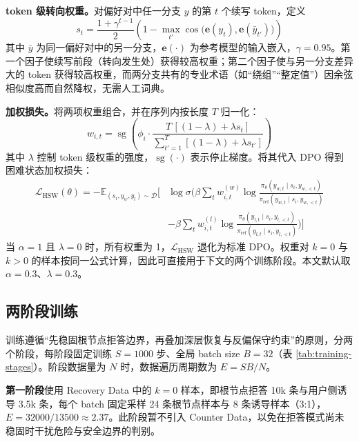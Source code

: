 \documentclass[fontset=fandol,type=master,campus=shenzhen,etitleauto=true]{hithesisbook}
\begin{document}
\textbf{token 级转向权重。}对偏好对中任一分支 $y$ 的第 $t$ 个续写 token，定义
\begin{equation}
s_t = \frac{1 + \gamma^{t-1}}{2} \left( 1 - \max_{t'} \cos\!\big(\mathbf{e}(y_t), \mathbf{e}(\bar{y}_{t'})\big) \right)
\end{equation}
其中 $\bar{y}$ 为同一偏好对中的另一分支，$\mathbf{e}(\cdot)$ 为参考模型的输入嵌入，$\gamma = 0.95$。第一个因子使续写前段（转向发生处）获得较高权重；第二个因子使与另一分支差异大的 token 获得较高权重，而两分支共有的专业术语（如“绕组”“整定值”）因余弦相似度高而自然降权，无需人工词典。

\textbf{加权损失。}将两项权重组合，并在序列内按长度 $T$ 归一化：
\begin{equation}
w_{i,t} = \operatorname{sg}\!\left( \phi_i \cdot \frac{T\,[(1 - \lambda) + \lambda s_t]}{\sum_{t'=1}^{T} [(1 - \lambda) + \lambda s_{t'}]} \right)
\end{equation}
其中 $\lambda$ 控制 token 级权重的强度，$\operatorname{sg}(\cdot)$ 表示停止梯度。将其代入 DPO 得到困难状态加权损失：
\begin{equation}
\begin{aligned}
\mathcal{L}_{\text{HSW}}(\theta) = -\mathbb{E}_{(s_i,y_w,y_l)\sim\mathcal{D}}\Bigg[
&\log\sigma\Bigg(\beta\sum_{t}w_{i,t}^{(w)}\log\frac{\pi_\theta(y_{w,t}\mid s_i,y_{w,<t})}{\pi_{\text{ref}}(y_{w,t}\mid s_i,y_{w,<t})} \\
&-\beta\sum_{t}w_{i,t}^{(l)}\log\frac{\pi_\theta(y_{l,t}\mid s_i,y_{l,<t})}{\pi_{\text{ref}}(y_{l,t}\mid s_i,y_{l,<t})}\Bigg)\Bigg]
\end{aligned}
\end{equation}
当 $\alpha = 1$ 且 $\lambda = 0$ 时，所有权重为 1，$\mathcal{L}_{\text{HSW}}$ 退化为标准 DPO。权重对 $k = 0$ 与 $k > 0$ 的样本按同一公式计算，因此可直接用于下文的两个训练阶段。本文默认取 $\alpha = 0.3$、$\lambda = 0.3$。

\subsection{两阶段训练}\label{ux5206ux9636ux6bb5ux8badux7ec3ux7ec4ux7ec7}

训练遵循“先稳固根节点拒答边界，再叠加深层恢复与反偏保守约束”的原则，分两个阶段，每阶段固定训练 $S = 1000$ 步、全局 batch size $B = 32$（表 \ref{tab:training-stages}）。阶段数据量为 $N$ 时，数据遍历周期数为 $E = SB/N$。

\textbf{第一阶段}使用 Recovery Data 中的 $k = 0$ 样本，即根节点拒答 10k 条与用户侧诱导 3.5k 条，每个 batch 固定采样 24 条根节点样本与 8 条诱导样本（3:1），$E = 32000 / 13500 \approx 2.37$。此阶段暂不引入 Counter Data，以免在拒答模式尚未稳固时干扰危险与安全边界的判别。
\end{document}

